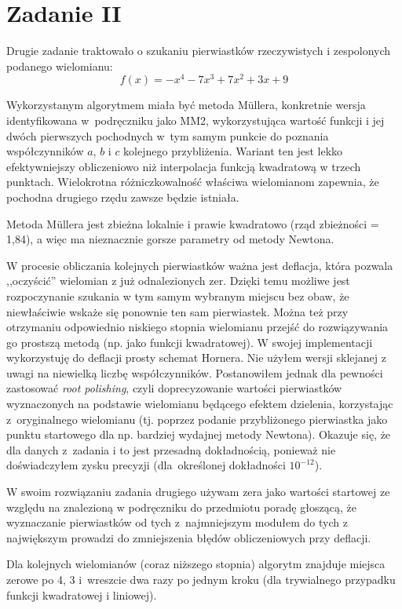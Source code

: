 \documentclass[12pt]{article}
\begin{document}
\section{Zadanie II}

Drugie zadanie traktowało o szukaniu pierwiastków rzeczywistych i zespolonych podanego wielomianu:
\[ f(x) = -x^4 - 7x^3 + 7x^2 + 3x + 9 \]

Wykorzystanym algorytmem miała być metoda Müllera, konkretnie wersja identyfikowana w~podręczniku jako MM2, wykorzystująca wartość funkcji i jej dwóch pierwszych pochodnych w~tym samym punkcie do poznania współczynników \(a\), \(b\) i \(c\) kolejnego przybliżenia. Wariant ten jest lekko efektywniejszy obliczeniowo niż interpolacja funkcją kwadratową w trzech punktach. Wielokrotna różniczkowalność właściwa wielomianom zapewnia, że pochodna drugiego rzędu zawsze będzie istniała.

Metoda Müllera jest zbieżna lokalnie i prawie kwadratowo (rząd zbieżności = 1,84), a więc ma nieznacznie gorsze parametry od metody Newtona.

W procesie obliczania kolejnych pierwiastków ważna jest deflacja, która pozwala ,,oczyścić'' wielomian z już odnalezionych zer. Dzięki temu możliwe jest rozpoczynanie szukania w tym samym wybranym miejscu bez obaw, że niewłaściwie wskaże się ponownie ten sam pierwiastek. Można też przy otrzymaniu odpowiednio niskiego stopnia wielomianu przejść do rozwiązywania go prostszą metodą (np. jako funkcji kwadratowej).  
W swojej implementacji wykorzystuję do deflacji prosty schemat Hornera. Nie użyłem wersji sklejanej z uwagi na niewielką liczbę współczynników. Postanowiłem jednak dla pewności zastosować \textit{root polishing}, czyli doprecyzowanie wartości pierwiastków wyznaczonych na podstawie wielomianu będącego efektem dzielenia, korzystając z~oryginalnego wielomianu (tj. poprzez podanie przybliżonego pierwiastka jako punktu startowego dla np. bardziej wydajnej metody Newtona). Okazuje się, że dla danych z~zadania i to jest przesadną dokładnością, ponieważ nie doświadczyłem zysku precyzji (dla~określonej dokładności \( 10^{-12} \)).

W swoim rozwiązaniu zadania drugiego używam zera jako wartości startowej ze względu na znalezioną w podręczniku do przedmiotu poradę głoszącą, że wyznaczanie pierwiastków od tych z~najmniejszym modułem do tych z największym prowadzi do zmniejszenia błędów obliczeniowych przy deflacji.

Dla kolejnych wielomianów (coraz niższego stopnia) algorytm znajduje miejsca zerowe po 4, 3 i~wreszcie dwa razy po jednym kroku (dla trywialnego przypadku funkcji kwadratowej i liniowej).
\end{document}

